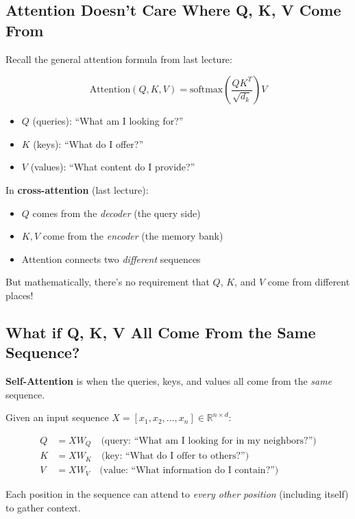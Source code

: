 \documentclass{article}
\begin{document}
\subsection{Attention Doesn't Care Where Q, K, V Come From}

Recall the general attention formula from last lecture:

\[
\text{Attention}(Q, K, V) = \text{softmax}\left(\frac{QK^T}{\sqrt{d_k}}\right)V
\]

\begin{itemize}
\item $Q$ (queries): ``What am I looking for?''
\item $K$ (keys): ``What do I offer?''
\item $V$ (values): ``What content do I provide?''
\end{itemize}

In \textbf{cross-attention} (last lecture):
\begin{itemize}
\item $Q$ comes from the \textit{decoder} (the query side)
\item $K, V$ come from the \textit{encoder} (the memory bank)
\item Attention connects two \textit{different} sequences
\end{itemize}

But mathematically, there's no requirement that $Q$, $K$, and $V$ come from different places!

\subsection{What if Q, K, V All Come From the Same Sequence?}

\begin{tcolorbox}[colback=green!5!white, colframe=green!50!black, title=Self-Attention: The Core Idea]
\textbf{Self-Attention} is when the queries, keys, and values all come from the \textit{same} sequence.

Given an input sequence $X = [x_1, x_2, \ldots, x_n] \in \mathbb{R}^{n \times d}$:

\begin{align}
Q &= XW_Q \quad \text{(query: ``What am I looking for in my neighbors?'')}\\
K &= XW_K \quad \text{(key: ``What do I offer to others?'')}\\
V &= XW_V \quad \text{(value: ``What information do I contain?'')}
\end{align}

Each position in the sequence can attend to \textit{every other position} (including itself) to gather context.
\end{tcolorbox}
\end{document}
